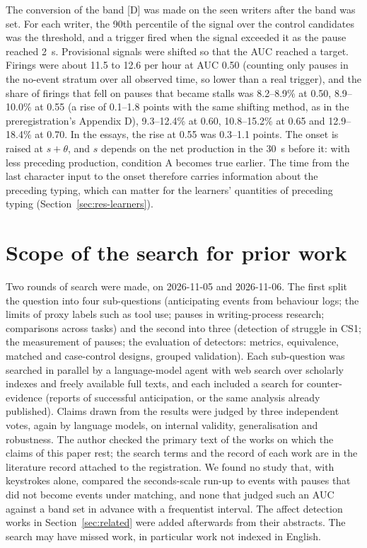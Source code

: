 The conversion of the band [D] was made on the seen writers after the band was set. For each writer, the 90th percentile
of the signal over the control candidates was the threshold, and a trigger fired when the signal exceeded it as the pause
reached 2~s. Provisional signals were shifted so that the AUC reached a target. Firings were about 11.5 to 12.6 per hour
at AUC 0.50 (counting only pauses in the no-event stratum over all observed time, so lower than a real trigger), and the
share of firings that fell on pauses that became stalls was 8.2--8.9\% at 0.50, 8.9--10.0\% at 0.55 (a rise of 0.1--1.8
points with the same shifting method, as in the preregistration's Appendix D), 9.3--12.4\% at
0.60, 10.8--15.2\% at 0.65 and 12.9--18.4\% at 0.70. In the essays, the rise at 0.55 was 0.3--1.1 points. The onset is raised at $s + \theta$, and $s$ depends on the
net production in the 30~s before it: with less preceding production, condition A becomes true earlier. The time from
the last character input to the onset therefore carries information about the preceding typing, which can matter for the
learners' quantities of preceding typing (Section~\ref{sec:res-learners}).

\section{Scope of the search for prior work}
\label{app:novelty}

Two rounds of search were made, on 2026-11-05 and 2026-11-06. The first split the question into four sub-questions
(anticipating events from behaviour logs; the limits of proxy labels such as tool use; pauses in writing-process
research; comparisons across tasks) and the second into three (detection of struggle in CS1; the measurement of pauses;
the evaluation of detectors: metrics, equivalence, matched and case-control designs, grouped validation). Each
sub-question was searched in parallel by a language-model agent with web search over scholarly indexes and freely
available full texts, and each included a search for counter-evidence (reports of successful anticipation, or the same
analysis already published). Claims drawn from the results were judged by three independent votes, again by language
models, on internal validity, generalisation and robustness. The author checked the primary text of the works on which
the claims of this paper rest; the search terms and the record of each work are in the literature record attached to the
registration. We found no study that, with keystrokes alone, compared the seconds-scale run-up to events with pauses that
did not become events under matching, and none that judged such an AUC against a band set in advance with a frequentist
interval. The affect detection works in Section~\ref{sec:related} were added afterwards from their abstracts. The search
may have missed work, in particular work not indexed in English.
